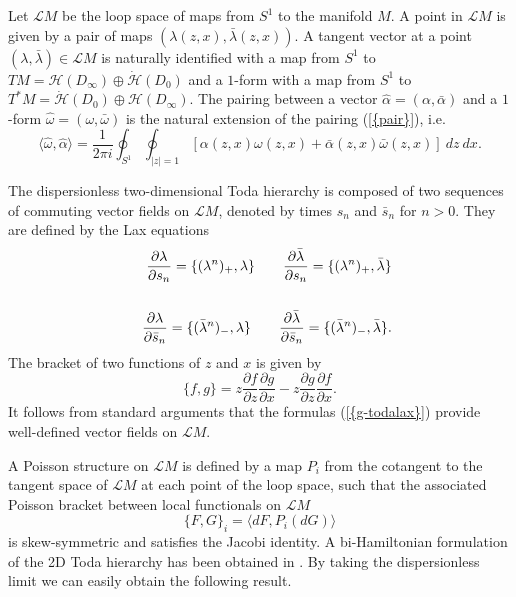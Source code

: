 \documentclass[numbook, envcountsame, envcountreset]{svjour3}
\begin{document}
\medskip

Let ${{\mathcal L}} M$ be the loop space of maps from $S^1$ to the manifold $M$. A point in ${{\mathcal L}} M$ is given by a pair of maps $( {\lambda}(z,x), \bar{\lambda} (z,x) )$. A tangent vector at a point $({\lambda},\bar{\lambda}) \in {{\mathcal L}} M$ is naturally identified with a map from $S^1$ to $TM=\mathcal{H} (D_{\infty}) \oplus \dot{\mathcal{H}} (D_0)$ and a $1$-form with a map from $S^1$ to $T^*M = \dot{\mathcal{H}} (D_{0}) \oplus \mathcal{H} (D_{\infty})$. The pairing between a vector $\hat\alpha = ( \alpha, \bar\alpha )$ and a $1$-form $\hat\omega = ( \omega , \bar\omega )$ is the natural extension of the pairing {(\ref{{pair}})}, i.e.
\begin{equation} \label{g-looppairing}
\langle\hat\omega, \hat\alpha \rangle = \frac1{2 \pi i} \oint_{S^1} \oint_{|z|=1}  [ \alpha(z,x) \omega(z,x) + \bar\alpha (z,x) \bar\omega(z,x) ] \ dz \ dx .
\end{equation}

The dispersionless two-dimensional Toda hierarchy is composed of two sequences of commuting vector fields on ${{\mathcal L}} M$, denoted by times $s_n$ and $\bar{s}_n$ for $n>0$. They are defined by the Lax equations
\begin{eqnarray} \label{g-todalax}
&&
\frac{{\partial} {\lambda}}{{\partial} s_n} = \{ ({\lambda}^n)_+ , {\lambda} \} \qquad
\frac{{\partial} \bar{\lambda}}{{\partial} s_n} = \{ ({\lambda}^n)_+ , \bar{\lambda} \}  
{\nonumber}\\
&&
\\
&&
\frac{{\partial} {\lambda}}{{\partial} \bar{s}_n} = \{ (\bar{\lambda}^n)_- , {\lambda} \}  \qquad
\frac{{\partial} \bar{\lambda}}{{\partial} \bar{s}_n} = \{ (\bar{\lambda}^n)_- , \bar{\lambda} \}  .
{\nonumber} 
\end{eqnarray}
The bracket of two functions of $z$ and $x$ is given by
\begin{equation}
\{ f, g \} = z \frac{{\partial} f}{{\partial} z} \frac{{\partial} g}{{\partial} x} - z \frac{{\partial} g}{{\partial} z} \frac{{\partial} f}{{\partial} x} .
\end{equation}
It follows from standard arguments \cite{tt} that the formulas {(\ref{{g-todalax}})} provide well-defined vector fields on ${{\mathcal L}} M$. 

A Poisson structure on ${{\mathcal L}} M$ is defined by a map $P_i$ from the cotangent to the tangent space of  ${{\mathcal L}} M$ at each point of the loop space, such that the associated Poisson bracket between local functionals on ${{\mathcal L}} M$
\begin{equation} \label{g-poissondef}
\{ F , G \}_i = \langle dF , P_i(dG) \rangle
\end{equation}
is skew-symmetric and satisfies the Jacobi identity. A bi-Hamiltonian formulation of the  2D Toda hierarchy has been obtained in \cite{ca1}. By taking the dispersionless limit we can easily  obtain the following result.
\end{document}
